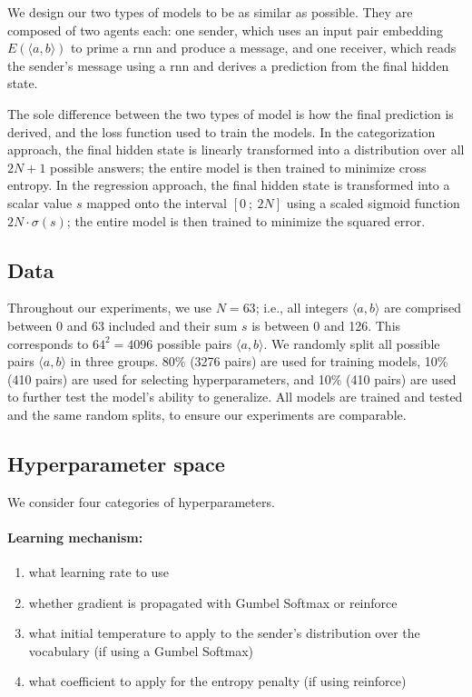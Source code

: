 \documentclass[twocolumn]{article}
\begin{document}
We design our two types of models to be as similar as possible. 
They are composed of two agents each: one sender, which uses an input pair embedding $E(\langle a,b \rangle)$ to prime a {\sc rnn} and produce a message, and one receiver, which reads the sender's message using a {\sc rnn} and derives a prediction from the final hidden state.

The sole difference between the two types of model is how the final prediction is derived, and the loss function used to train the models.
In the categorization approach, the final hidden state is linearly transformed into a distribution over all $2N + 1$ possible answers; the entire model is then trained to minimize cross entropy.
In the regression approach, the final hidden state is transformed into a scalar value $s$ mapped onto the interval $\left[0~; ~2N \right]$ using a scaled sigmoid function $2N\cdot\sigma(s)$; the entire model is then trained to minimize the squared error. 

\subsection{Data} \label{sec:experiment:data}

Throughout our experiments, we use $N=63$; i.e., all integers $\langle a,b \rangle$ are comprised between 0 and 63 included and their sum $s$ is between 0 and 126. 
This corresponds to $64^2=4096$ possible pairs $\langle a,b \rangle$.
We randomly split all possible pairs $\langle a,b \rangle$ in three groups. 80\% (3276 pairs) are used for training models, 10\% (410 pairs) are used for selecting hyperparameters, and 10\% (410 pairs) are used to further test the model's ability to generalize.
All models are trained and tested and the same random splits, to ensure our experiments are comparable.

\subsection{Hyperparameter space} \label{sec:experiment:hparams}

We consider four categories of hyperparameters.

\vspace*{-0.5em}
\paragraph{Learning mechanism:} 
\begin{enumerate}[label=(\roman*)]
    \vspace*{-0.5em}
    \itemsep-0.25em 
    \item what learning rate to use
    \item \label{it:hp:mechanism} whether gradient is propagated with Gumbel Softmax or {\sc reinforce}
    \item \label{it:hp:temp} what initial temperature to apply to the sender's distribution over the vocabulary (if using a Gumbel Softmax)
    \item \label{it:hp:entropy} what coefficient to apply for the entropy penalty (if using {\sc reinforce})
\end{enumerate}
\end{document}
